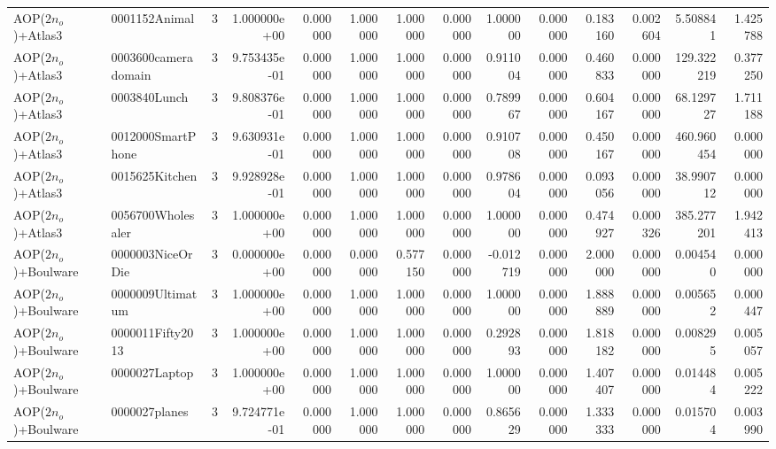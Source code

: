 \begin{tabular}{llrr|r|rr|rr|rr|rrr}
      AOP($2 n_o$)+Atlas3 &          0001152Animal &       3 & 1.000000e+00 & 0.000000 & 1.000000 &      1.000000 & 0.000000 &      1.000000 & 0.000000 &      0.183160 &    0.002604 &     5.508841 &    1.425788 \\
      AOP($2 n_o$)+Atlas3 &    0003600cameradomain &       3 & 9.753435e-01 & 0.000000 & 1.000000 &      1.000000 & 0.000000 &      0.911004 & 0.000000 &      0.460833 &    0.000000 &   129.322219 &    0.377250 \\
      AOP($2 n_o$)+Atlas3 &           0003840Lunch &       3 & 9.808376e-01 & 0.000000 & 1.000000 &      1.000000 & 0.000000 &      0.789967 & 0.000000 &      0.604167 &    0.000000 &    68.129727 &    1.711188 \\
      AOP($2 n_o$)+Atlas3 &      0012000SmartPhone &       3 & 9.630931e-01 & 0.000000 & 1.000000 &      1.000000 & 0.000000 &      0.910708 & 0.000000 &      0.450167 &    0.000000 &   460.960454 &    0.000000 \\
      AOP($2 n_o$)+Atlas3 &         0015625Kitchen &       3 & 9.928928e-01 & 0.000000 & 1.000000 &      1.000000 & 0.000000 &      0.978604 & 0.000000 &      0.093056 &    0.000000 &    38.990712 &    0.000000 \\
      AOP($2 n_o$)+Atlas3 &      0056700Wholesaler &       3 & 1.000000e+00 & 0.000000 & 1.000000 &      1.000000 & 0.000000 &      1.000000 & 0.000000 &      0.474927 &    0.000326 &   385.277201 &    1.942413 \\
    AOP($2 n_o$)+Boulware &       0000003NiceOrDie &       3 & 0.000000e+00 & 0.000000 & 0.000000 &      0.577150 & 0.000000 &     -0.012719 & 0.000000 &      2.000000 &    0.000000 &     0.004540 &    0.000000 \\
    AOP($2 n_o$)+Boulware &       0000009Ultimatum &       3 & 1.000000e+00 & 0.000000 & 1.000000 &      1.000000 & 0.000000 &      1.000000 & 0.000000 &      1.888889 &    0.000000 &     0.005652 &    0.000447 \\
    AOP($2 n_o$)+Boulware &       0000011Fifty2013 &       3 & 1.000000e+00 & 0.000000 & 1.000000 &      1.000000 & 0.000000 &      0.292893 & 0.000000 &      1.818182 &    0.000000 &     0.008295 &    0.005057 \\
    AOP($2 n_o$)+Boulware &          0000027Laptop &       3 & 1.000000e+00 & 0.000000 & 1.000000 &      1.000000 & 0.000000 &      1.000000 & 0.000000 &      1.407407 &    0.000000 &     0.014484 &    0.005222 \\
    AOP($2 n_o$)+Boulware &          0000027planes &       3 & 9.724771e-01 & 0.000000 & 1.000000 &      1.000000 & 0.000000 &      0.865629 & 0.000000 &      1.333333 &    0.000000 &     0.015704 &    0.003990 \\

\end{tabular}

